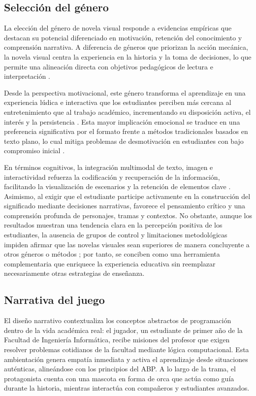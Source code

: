 \subsection{Selección del género}

La elección del género de novela visual responde a evidencias empíricas que destacan su potencial diferenciado en motivación, retención del conocimiento y comprensión narrativa. A diferencia de géneros que priorizan la acción mecánica, la novela visual centra la experiencia en la historia y la toma de decisiones, lo que permite una alineación directa con objetivos pedagógicos de lectura e interpretación \cite{vn2}.

Desde la perspectiva motivacional, este género transforma el aprendizaje en una experiencia lúdica e interactiva que los estudiantes perciben más cercana al entretenimiento que al trabajo académico, incrementando su disposición activa, el interés y la persistencia \cite{vn1}. Esta mayor implicación emocional se traduce en una preferencia significativa por el formato frente a métodos tradicionales basados en texto plano, lo cual mitiga problemas de desmotivación en estudiantes con bajo compromiso inicial \cite{vn1}.

En términos cognitivos, la integración multimodal de texto, imagen e interactividad refuerza la codificación y recuperación de la información, facilitando la visualización de escenarios y la retención de elementos clave \cite{vn1}. Asimismo, al exigir que el estudiante participe activamente en la construcción del significado mediante decisiones narrativas, favorece el pensamiento crítico y una comprensión profunda de personajes, tramas y contextos. No obstante, aunque los resultados muestran una tendencia clara en la percepción positiva de los estudiantes, la ausencia de grupos de control y limitaciones metodológicas impiden afirmar que las novelas visuales sean superiores de manera concluyente a otros géneros o métodos \cite{vn3}; por tanto, se conciben como una herramienta complementaria que enriquece la experiencia educativa sin reemplazar necesariamente otras estrategias de enseñanza.

\subsection{Narrativa del juego}

El diseño narrativo contextualiza los conceptos abstractos de programación dentro de la vida académica real: el jugador, un estudiante de primer año de la Facultad de Ingeniería Informática, recibe misiones del profesor que exigen resolver problemas cotidianos de la facultad mediante lógica computacional. Esta ambientación genera empatía inmediata y activa el aprendizaje desde situaciones auténticas, alineándose con los principios del ABP. A lo largo de la trama, el protagonista cuenta con una mascota en forma de orca que actúa como guía durante la historia, mientras interactúa con compañeros y estudiantes avanzados.

